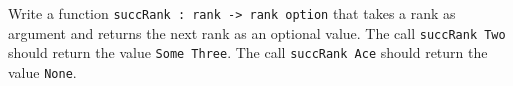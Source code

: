 Write a function \lstinline{succRank : rank -> rank option} that takes
a rank as argument and returns the next rank as an optional value.
The call \lstinline{succRank Two} should return the
value \lstinline{Some Three}.  The call \lstinline{succRank Ace}
should return the value \lstinline{None}.
